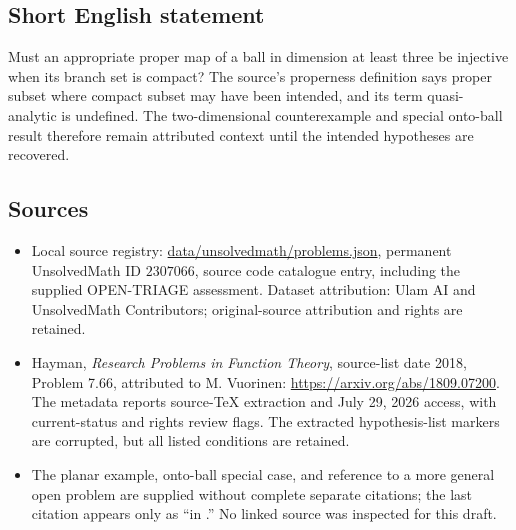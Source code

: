 \documentclass[11pt]{article}
\begin{document}
\subsection{Short English statement}
Must an appropriate proper map of a ball in dimension at least three be injective when its branch set is compact? The source's properness definition says proper subset where compact subset may have been intended, and its term quasi-analytic is undefined. The two-dimensional counterexample and special onto-ball result therefore remain attributed context until the intended hypotheses are recovered.
\subsection{Sources}
\begin{itemize}
\item Local source registry: \url{data/unsolvedmath/problems.json}, permanent UnsolvedMath ID $2307066$, source code catalogue entry, including the supplied OPEN-TRIAGE assessment. Dataset attribution: Ulam AI and UnsolvedMath Contributors; original-source attribution and rights are retained.
\item Hayman, \emph{Research Problems in Function Theory}, source-list date 2018, Problem 7.66, attributed to M. Vuorinen: \url{https://arxiv.org/abs/1809.07200}. The metadata reports source-TeX extraction and July 29, 2026 access, with current-status and rights review flags. The extracted hypothesis-list markers are corrupted, but all listed conditions are retained.
\item The planar example, onto-ball special case, and reference to a more general open problem are supplied without complete separate citations; the last citation appears only as ``in .'' No linked source was inspected for this draft.
\end{itemize}
\end{document}
